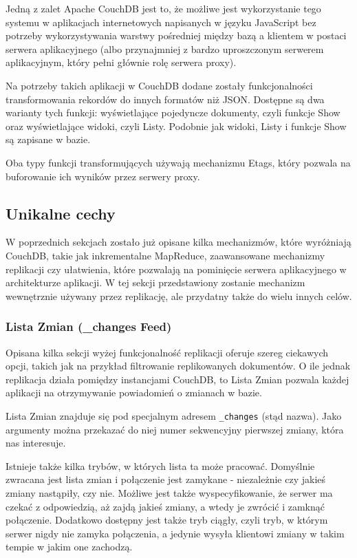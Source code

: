 Jedną z zalet Apache CouchDB jest to, że możliwe jest wykorzystanie tego systemu w aplikacjach internetowych napisanych w języku JavaScript bez potrzeby wykorzystywania warstwy pośredniej między bazą a klientem w postaci serwera aplikacyjnego (albo przynajmniej z bardzo uproszczonym serwerem aplikacyjnym, który pełni głównie rolę serwera proxy).

Na potrzeby takich aplikacji w CouchDB dodane zostały funkcjonalności transformowania rekordów do innych formatów niż JSON.
Dostępne są dwa warianty tych funkcji: wyświetlające pojedyncze dokumenty, czyli funkcje Show oraz wyświetlające widoki, czyli Listy.
Podobnie jak widoki, Listy i funkcje Show są zapisane w bazie.

Oba typy funkcji transformujących używają mechanizmu Etags, który pozwala na buforowanie ich wyników przez serwery proxy.

\subsection*{Unikalne cechy}

W poprzednich sekcjach zostało już opisane kilka mechanizmów, które wyróżniają CouchDB, takie jak inkrementalne MapReduce, zaawansowane mechanizmy replikacji czy ułatwienia, które pozwalają na pominięcie serwera aplikacyjnego w architekturze aplikacji.
W tej sekcji przedstawiony zostanie mechanizm wewnętrznie używany przez replikację, ale przydatny także do wielu innych celów.

\subsubsection*{Lista Zmian (\_changes Feed)}

Opisana kilka sekcji wyżej funkcjonalność replikacji oferuje szereg ciekawych opcji, takich jak na przykład filtrowanie replikowanych dokumentów.
O ile jednak replikacja działa pomiędzy instancjami CouchDB, to Lista Zmian pozwala każdej aplikacji na otrzymywanie powiadomień o zmianach w bazie.

Lista Zmian znajduje się pod specjalnym adresem \verb+_changes+ (stąd nazwa).
Jako argumenty można przekazać do niej numer sekwencyjny pierwszej zmiany, która nas interesuje.

Istnieje także kilka trybów, w których lista ta może pracować.
Domyślnie zwracana jest lista zmian i połączenie jest zamykane - niezależnie czy jakieś zmiany nastąpiły, czy nie.
Możliwe jest także wyspecyfikowanie, że serwer ma czekać z odpowiedzią, aż zajdą jakieś zmiany, a wtedy je zwrócić i zamknąć połączenie.
Dodatkowo dostępny jest także tryb ciągły, czyli tryb, w którym serwer nigdy nie zamyka połączenia, a jedynie wysyła klientowi zmiany w takim tempie w jakim one zachodzą.

